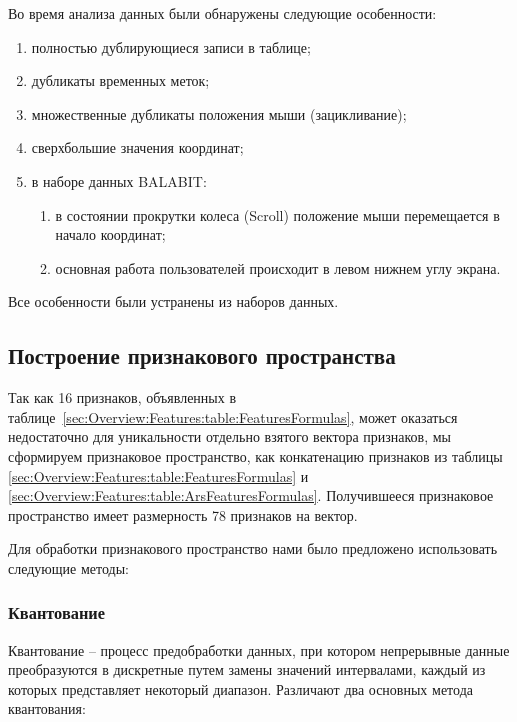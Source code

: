 \documentclass[12pt]{article}
\begin{document}
    \par Во время анализа данных были обнаружены следующие особенности:

    \begin{enumerate}
        \item полностью дублирующиеся записи в таблице;
        \item дубликаты временных меток;
        \item множественные дубликаты положения мыши (зацикливание);
        \item сверхбольшие значения координат;
        \item в наборе данных BALABIT:
        \begin{enumerate}
            \item в состоянии прокрутки колеса (Scroll) положение мыши перемещается в начало координат;
            \item основная работа пользователей происходит в левом нижнем углу экрана.
        \end{enumerate}
    \end{enumerate}

    \noindent Все особенности были устранены из наборов данных.


    \subsection{Построение признакового пространства}
    \label{sec:Research:FeatureSpace}

    \par Так как 16 признаков, объявленных в таблице~\ref{sec:Overview:Features:table:FeaturesFormulas}, может оказаться недостаточно для уникальности отдельно взятого вектора признаков, мы сформируем признаковое пространство, как конкатенацию признаков из таблицы \ref{sec:Overview:Features:table:FeaturesFormulas} и \ref{sec:Overview:Features:table:ArsFeaturesFormulas}. Получившееся признаковое пространство имеет размерность 78 признаков на вектор.

    \par Для обработки признакового пространство нами было предложено использовать следующие методы:

    \subsubsection{Квантование}
    \label{sec:Research:FeatureSpace:Quantile}

    \par Квантование \cite{BINNING} -- процесс предобработки данных, при котором непрерывные данные преобразуются в дискретные путем замены значений интервалами, каждый из которых представляет некоторый диапазон. Различают два основных метода квантования:
\end{document}
